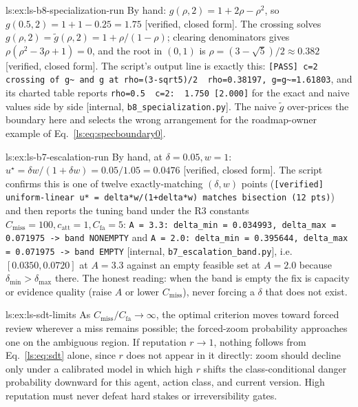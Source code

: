 \begin{pdSolution}{ls:ex:ls-b8-specialization-run}
By hand: $g(\rho,2)=1+2\rho-\rho^2$, so $g(0.5,2)=1+1-0.25=1.75$ [verified, closed form]. The crossing solves $g(\rho,2)=\tilde g(\rho,2)=1+\rho/(1-\rho)$; clearing denominators gives $\rho(\rho^2-3\rho+1)=0$, and the root in $(0,1)$ is $\rho=(3-\sqrt5)/2\approx0.382$ [verified, closed form]. The script's output line is exactly this: \texttt{[PASS] c=2 crossing of g\textasciitilde{} and g at rho=(3-sqrt5)/2\ \ rho=0.38197, g=g\textasciitilde{}=1.61803}, and its charted table reports \texttt{rho=0.5\ \ c=2:\ \ 1.750\ [2.000]} for the exact and naive values side by side [internal, \texttt{b8\_specialization.py}]. The naive $\tilde g$ over-prices the boundary here and selects the wrong arrangement for the roadmap-owner example of Eq.~\ref{ls:eq:specboundary0}.
\end{pdSolution}
\begin{pdSolution}{ls:ex:ls-b7-escalation-run}
By hand, at $\delta=0.05,w=1$: $u^\star=\delta w/(1+\delta w)=0.05/1.05=0.0476$ [verified, closed form]. The script confirms this is one of twelve exactly-matching $(\delta,w)$ points (\texttt{[verified] uniform-linear u* = delta*w\allowbreak/(1+delta*w) matches bisection (12 pts)}) and then reports the tuning band under the R3 constants $C_{\mathrm{miss}}=100,c_{\mathrm{att}}=1,C_{\mathrm{fa}}=5$: \texttt{A = 3.3: delta\_min = 0.034993, delta\_max = 0.071975 -> band NONEMPTY} and \texttt{A = 2.0: delta\_min = 0.395644, delta\_max = 0.071975 -> band EMPTY} [internal, \texttt{b7\allowbreak\_escalation\allowbreak\_band.py}], i.e.\ $[0.0350,0.0720]$ at $A=3.3$ against an empty feasible set at $A=2.0$ because $\delta_{\min}>\delta_{\max}$ there. The honest reading: when the band is empty the fix is capacity or evidence quality (raise $A$ or lower $C_{\mathrm{miss}}$), never forcing a $\delta$ that does not exist.
\end{pdSolution}
\begin{pdSolution}{ls:ex:ls-sdt-limits}
As $C_{\mathrm{miss}}/C_{\mathrm{fa}}\to\infty$, the optimal criterion moves toward forced review wherever a miss remains possible; the forced-zoom probability approaches one on the ambiguous region. If reputation $r\to1$, nothing follows from Eq.~\ref{ls:eq:sdt} alone, since $r$ does not appear in it directly: zoom should decline only under a calibrated model in which high $r$ shifts the class-conditional danger probability downward for this agent, action class, and current version. High reputation must never defeat hard stakes or irreversibility gates.
\end{pdSolution}
